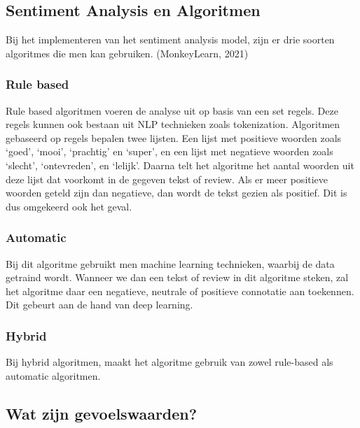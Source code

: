 \subsection{Sentiment Analysis en Algoritmen}
\label{sec:sentimentanalysisenalgoritmen}

Bij het implementeren van het sentiment analysis model, zijn er drie soorten algoritmes die men kan gebruiken. (MonkeyLearn, 2021)

\subsubsection{Rule based}
\label{rule based}

Rule based algoritmen voeren de analyse uit op basis van een set regels. Deze regels kunnen ook bestaan uit NLP technieken zoals tokenization. Algoritmen gebaseerd op regels bepalen twee lijsten. Een lijst met positieve woorden zoals ‘goed’, ‘mooi’, ‘prachtig’ en ‘super’, en een lijst met negatieve woorden zoals ‘slecht’, ‘ontevreden’,  en  ‘lelijk’. Daarna telt het algoritme het aantal woorden uit deze lijst dat voorkomt in de gegeven tekst of review. Als er meer positieve woorden geteld zijn dan negatieve, dan wordt de tekst gezien als positief. Dit is dus omgekeerd ook het geval. \autocite{MonkeyLearn2021}

\subsubsection{Automatic}
\label{automatic}

Bij dit algoritme gebruikt men machine learning technieken, waarbij de data getraind wordt. Wanneer we dan een tekst of review in dit algoritme steken, zal het algoritme daar een negatieve, neutrale of positieve connotatie aan toekennen. Dit gebeurt aan de hand van deep learning. \autocite{MonkeyLearn2021}

\subsubsection{Hybrid}
\label{hybrid}

Bij hybrid algoritmen, maakt het algoritme gebruik van zowel rule-based als automatic algoritmen. \autocite{MonkeyLearn2021}

\subsection{Wat zijn gevoelswaarden?}
\label{gevoelswaarden}

